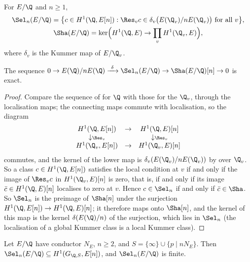 \begin{definition}\label{def:galcoh:selmer-sha}
For $E/\Q$ and $n\ge1$,
\begin{gather*}
\Sel_n(E/\Q)=\bigl\{c\in H^1(\Q,E[n]):\Res_vc\in\delta_v\bigl(E(\Q_v)/nE(\Q_v)\bigr)\text{ for all }v\bigr\},\\
\Sha(E/\Q)=\ker\Bigl(H^1(\Q,E)\to\prod_vH^1(\Q_v,E)\Bigr),
\end{gather*}
where $\delta_v$ is the Kummer map of $E/\Q_v$.
\end{definition}

\begin{proposition}\label{prop:galcoh:selmer-sha}
The sequence $0\to E(\Q)/nE(\Q)\xrightarrow{\ \delta\ }\Sel_n(E/\Q)\to\Sha(E/\Q)[n]\to0$ is exact.
\end{proposition}

\begin{proof}
Compare the sequence of  for $\Q$ with those for the $\Q_v$, through the localisation maps; the connecting maps commute with
localisation, so the diagram
\[
\begin{array}{ccc}
H^1(\Q,E[n])&\to&H^1(\Q,E)[n]\\
\downarrow\scriptstyle\Res_v&&\downarrow\scriptstyle\Res_v\\
H^1(\Q_v,E[n])&\to&H^1(\Q_v,E)[n]
\end{array}
\]
commutes, and the kernel of the lower map is $\delta_v(E(\Q_v)/nE(\Q_v))$ by  over $\Q_v$. So a class $c\in H^1(\Q,E[n])$ satisfies the local
condition at $v$ if and only if the image of $\Res_vc$ in $H^1(\Q_v,E)[n]$ is zero, that is, if and only if its image $\bar c\in H^1(\Q,E)[n]$ localises to zero at $v$. Hence
$c\in\Sel_n$ if and only if $\bar c\in\Sha$. So $\Sel_n$ is the preimage of $\Sha[n]$ under the surjection $H^1(\Q,E[n])\to H^1(\Q,E)[n]$; it therefore maps onto $\Sha[n]$, and
the kernel of this map is the kernel $\delta(E(\Q)/n)$ of the surjection, which lies in $\Sel_n$ (the localisation of a global Kummer class is a local Kummer class).
\end{proof}

\begin{theorem}\label{thm:galcoh:selmer-finite}
Let $E/\Q$ have conductor $N_E$, $n\ge2$, and $S=\{\infty\}\cup\{p\mid nN_E\}$. Then $\Sel_n(E/\Q)\subseteq H^1(G_{\Q,S},E[n])$, and $\Sel_n(E/\Q)$ is finite.
\end{theorem}

